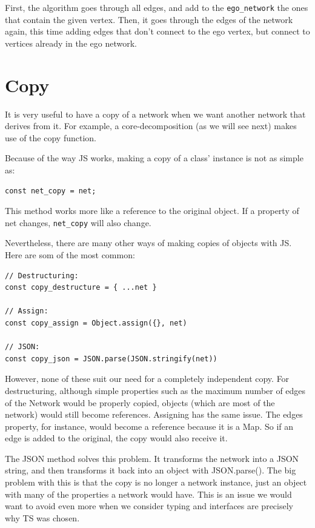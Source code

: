 First, the algorithm goes through all edges, and add to the \texttt{ego_network}
the ones that contain the given vertex.
Then, it goes through the edges of the network again,
this time adding edges that don't connect to the ego vertex,
but connect to vertices already in the ego network.

\section{Copy}

It is very useful to have a copy of a network
when we want another network that derives from it.
For example, a core-decomposition (as we will see next)
makes use of the copy function.

Because of the way JS works, making a copy of a class' instance
is not as simple as:
\begin{verbatim}
const net_copy = net;
\end{verbatim}

This method works more like a reference to the original object.
If a property of net changes, \texttt{net_copy} will also change.

Nevertheless, there are many other ways of making copies of objects with JS.
Here are som of the most common:
\begin{verbatim}
// Destructuring:
const copy_destructure = { ...net }

// Assign:
const copy_assign = Object.assign({}, net)

// JSON:
const copy_json = JSON.parse(JSON.stringify(net))
\end{verbatim}

However, none of these suit our need for a completely independent copy.
For destructuring, although simple properties such as the maximum number of edges of the Network would be properly copied,
objects (which are most of the network) would still become references.
Assigning has the same issue.
The edges property, for instance, would become a reference because it is a Map.
So if an edge is added to the original, the copy would also receive it.

The JSON method solves this problem.
It transforms the network into a JSON string, and then transforms it back into an object with JSON.parse().
The big problem with this is that the copy is no longer a network instance, just an object with many of the properties a network would have.
This is an issue we would want to avoid even more when we consider typing and interfaces are precisely why TS was chosen.

